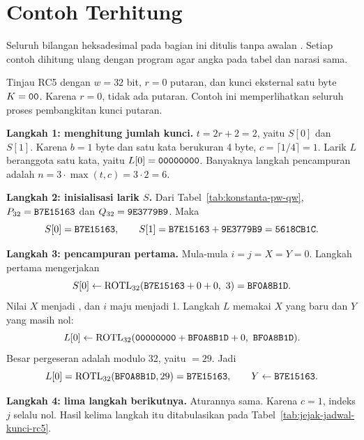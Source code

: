 \section{Contoh Terhitung}


Seluruh bilangan heksadesimal pada bagian ini ditulis tanpa awalan .
Setiap contoh dihitung ulang dengan program agar angka pada tabel dan narasi
sama.

\begin{example}
\label{ex:rc5-jadwal}
Tinjau RC5 dengan $w = 32$ bit, $r = 0$ putaran, dan kunci eksternal satu byte
$K = \texttt{00}$. Karena $r = 0$, tidak ada putaran. Contoh ini memperlihatkan
seluruh proses pembangkitan kunci putaran.

\textbf{Langkah 1: menghitung jumlah kunci.} $t = 2r + 2 = 2$, yaitu $S[0]$ dan
$S[1]$. Karena $b = 1$ byte dan satu kata berukuran 4 byte,
$c = \lceil 1/4 \rceil = 1$. Larik $L$ beranggota satu kata, yaitu
$L[0] = \texttt{00000000}$. Banyaknya langkah pencampuran adalah
$n = 3 \cdot \max(t,c) = 3 \cdot 2 = 6$.

\textbf{Langkah 2: inisialisasi larik $S$.} Dari
Tabel~\ref{tab:konstanta-pw-qw}, $P_{32} = \texttt{B7E15163}$ dan
$Q_{32} = \texttt{9E3779B9}$. Maka
\[
S[0] = \texttt{B7E15163}, \qquad
S[1] = \texttt{B7E15163} + \texttt{9E3779B9} = \texttt{5618CB1C}.
\]

\textbf{Langkah 3: pencampuran pertama.} Mula-mula $i = j = X = Y = 0$. Langkah
pertama mengerjakan
\[
S[0] \leftarrow \mathrm{ROTL}_{32}(\texttt{B7E15163} + 0 + 0,\ 3) = \texttt{BF0A8B1D}.
\]
Nilai $X$ menjadi , dan $i$ maju menjadi 1. Langkah $L$ memakai
$X$ yang baru dan $Y$ yang masih nol:
\[
L[0] \leftarrow \mathrm{ROTL}_{32}(\code{00000000} + \code{BF0A8B1D} + 0,\ \code{BF0A8B1D}).
\]
Besar pergeseran adalah  modulo 32, yaitu  $= 29$. Jadi
\[
L[0] = \mathrm{ROTL}_{32}(\texttt{BF0A8B1D}, 29) = \texttt{B7E15163}, \qquad
Y \leftarrow \texttt{B7E15163}.
\]

\textbf{Langkah 4: lima langkah berikutnya.} Aturannya sama. Karena $c = 1$,
indeks $j$ selalu nol. Hasil kelima langkah itu ditabulasikan pada
Tabel~\ref{tab:jejak-jadwal-kunci-rc5}.


\end{example}
